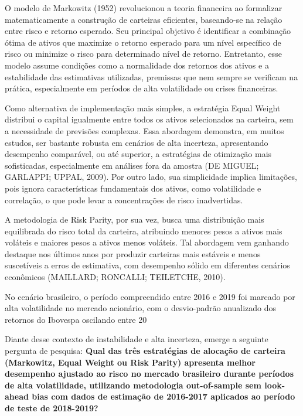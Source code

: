 O modelo de Markowitz (1952) revolucionou a teoria financeira ao formalizar matematicamente a construção de carteiras eficientes, baseando-se na relação entre risco e retorno esperado. Seu principal objetivo é identificar a combinação ótima de ativos que maximize o retorno esperado para um nível específico de risco ou minimize o risco para determinado nível de retorno. Entretanto, esse modelo assume condições como a normalidade dos retornos dos ativos e a estabilidade das estimativas utilizadas, premissas que nem sempre se verificam na prática, especialmente em períodos de alta volatilidade ou crises financeiras.

Como alternativa de implementação mais simples, a estratégia Equal Weight distribui o capital igualmente entre todos os ativos selecionados na carteira, sem a necessidade de previsões complexas. Essa abordagem demonstra, em muitos estudos, ser bastante robusta em cenários de alta incerteza, apresentando desempenho comparável, ou até superior, a estratégias de otimização mais sofisticadas, especialmente em análises fora da amostra (DE MIGUEL; GARLAPPI; UPPAL, 2009). Por outro lado, sua simplicidade implica limitações, pois ignora características fundamentais dos ativos, como volatilidade e correlação, o que pode levar a concentrações de risco inadvertidas.

A metodologia de Risk Parity, por sua vez, busca uma distribuição mais equilibrada do risco total da carteira, atribuindo menores pesos a ativos mais voláteis e maiores pesos a ativos menos voláteis. Tal abordagem vem ganhando destaque nos últimos anos por produzir carteiras mais estáveis e menos suscetíveis a erros de estimativa, com desempenho sólido em diferentes cenários econômicos (MAILLARD; RONCALLI; TEILETCHE, 2010).

No cenário brasileiro, o período compreendido entre 2016 e 2019 foi marcado por alta volatilidade no mercado acionário, com o desvio-padrão anualizado dos retornos do Ibovespa oscilando entre 20%

Diante desse contexto de instabilidade e alta incerteza, emerge a seguinte pergunta de pesquisa: \textbf{Qual das três estratégias de alocação de carteira (Markowitz, Equal Weight ou Risk Parity) apresenta melhor desempenho ajustado ao risco no mercado brasileiro durante períodos de alta volatilidade, utilizando metodologia out-of-sample sem look-ahead bias com dados de estimação de 2016-2017 aplicados ao período de teste de 2018-2019?}

